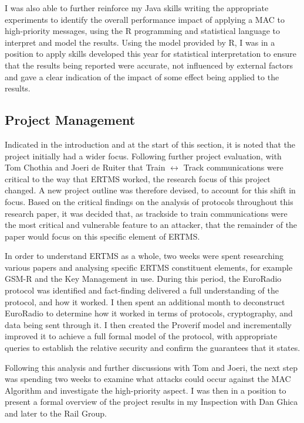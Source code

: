 \documentclass[twoside,11pt,a4paper]{article}
\begin{document}
I was also able to further reinforce my Java skills writing the appropriate experiments to identify the overall performance impact of applying a MAC to high-priority messages, using the R programming and statistical language to interpret and model the results. Using the model provided by R, I was in a position to apply skills developed this year for statistical interpretation to ensure that the results being reported were accurate, not influenced by external factors and gave a clear indication of the impact of some effect being applied to the results.

\subsection{Project Management}
Indicated in the introduction and at the start of this section, it is noted that the project initially had a wider focus. Following further project evaluation, with Tom Chothia and Joeri de Ruiter that Train $\leftrightarrow$ Track communications were critical to the way that ERTMS worked, the research focus of this project changed. A new project outline was therefore  devised, to account for this shift in focus. Based on the critical findings on the analysis of protocols throughout this research paper, it was decided that, as trackside to train communications were the most critical and vulnerable feature to an attacker, that the remainder of the paper would focus on this specific element of ERTMS.

In order to understand ERTMS as a whole, two weeks were spent researching various papers and analysing specific ERTMS constituent elements, for example GSM-R and the Key Management in use. During this period, the EuroRadio protocol was identified and fact-finding delivered a full understanding of the protocol, and how it worked. I then spent an additional month to deconstruct EuroRadio to determine how it worked in terms of protocols, cryptography, and data being sent through it. I then created the Proverif model and incrementally improved it to achieve a full formal model of the protocol, with appropriate queries to establish the relative security and confirm the guarantees that it states.

Following this analysis and further discussions with Tom and Joeri, the next step was spending two weeks to examine what attacks could occur against the MAC Algorithm and investigate the high-priority aspect. I was then in a position to present a formal overview of the project results in my Inspection with Dan Ghica and later to the Rail Group.
\end{document}
